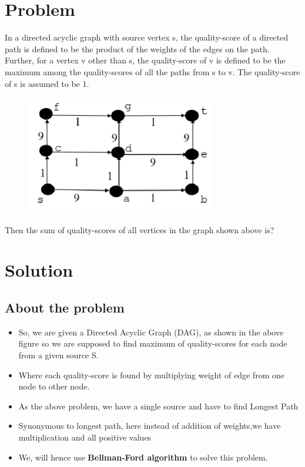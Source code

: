 \documentclass[journal,12pt,twocolumn]{IEEEtran}
\begin{document}
\section{Problem}
In a directed acyclic graph with source vertex s, the quality-score of a directed path is defined to be the product of the weights of the edges on the path. Further, for a vertex v other than s, the quality-score of v is defined to be the maximum among the quality-scores of all the paths from s to v. The quality-score of s is assumed to be 1.\\

\begin{figure}[!h]
    \centering
    \includegraphics[scale=1]{figures/ee18btech11019_graph.PNG}
    \label{fig:verification}
\end{figure}
Then the sum of quality-scores of all vertices in the graph shown above is?
\section{Solution}
\subsection{\textbf{About the problem}}
\begin{itemize}

\item So, we are given a Directed Acyclic Graph (DAG), as shown in the above figure so we are supposed to find maximum of quality-scores for each node from a given source S.
\item Where each quality-score is found by multiplying weight of edge from one node to other node.
\item As the above problem, we have a single source and have to find Longest Path
\item Synonymous to longest path, here instead of addition of weights,we have multiplication and all positive values
\item We, will hence use \textbf{Bellman-Ford algorithm} to solve this problem.

\end{itemize}
\end{document}
